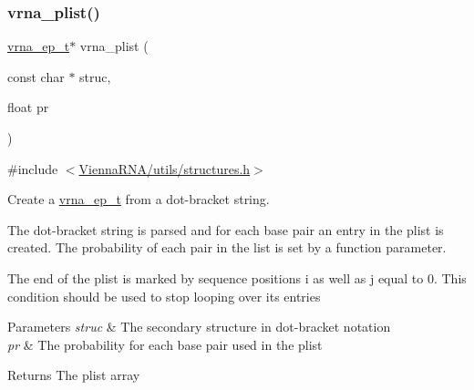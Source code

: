 \subsubsection{\texorpdfstring{vrna\+\_\+plist()}{vrna\_plist()}}
{\footnotesize\ttfamily \hyperlink{group__struct__utils__plist_gab9ac98ab55ded9fb90043b024b915aca}{vrna\+\_\+ep\+\_\+t}$\ast$ vrna\+\_\+plist (\begin{DoxyParamCaption}\item[{const char $\ast$}]{struc,  }\item[{float}]{pr }\end{DoxyParamCaption})}



{\ttfamily \#include $<$\hyperlink{utils_2structures_8h}{Vienna\+R\+N\+A/utils/structures.\+h}$>$}



Create a \hyperlink{group__struct__utils__plist_gab9ac98ab55ded9fb90043b024b915aca}{vrna\+\_\+ep\+\_\+t} from a dot-\/bracket string. 

The dot-\/bracket string is parsed and for each base pair an entry in the plist is created. The probability of each pair in the list is set by a function parameter.

The end of the plist is marked by sequence positions i as well as j equal to 0. This condition should be used to stop looping over its entries


\begin{DoxyParams}{Parameters}
{\em struc} & The secondary structure in dot-\/bracket notation \\
\hline
{\em pr} & The probability for each base pair used in the plist \\
\hline
\end{DoxyParams}
\begin{DoxyReturn}{Returns}
The plist array 
\end{DoxyReturn}
